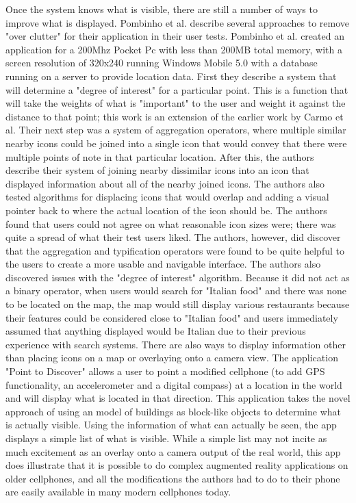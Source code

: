 \documentclass{acm_proc_article-sp}
\begin{document}
Once the system knows what is visible, there are still a number of ways to improve what is displayed.  Pombinho et al. describe several approaches to remove "over clutter" for their application in their user tests.  Pombinho et al. created an application for a 200Mhz Pocket Pc with less than 200MB total memory, with a screen resolution of 320x240 running Windows Mobile 5.0 with a database running on a server to provide location data.  First they describe a system that will determine a "degree of interest" for a particular point. This is a function that will take the weights of what is "important" to the user and weight it against the distance to that point; this work is an extension of the earlier work by Carmo et al. \cite{carmo2008movisys}  Their next step was a system of aggregation operators, where multiple similar nearby icons could be joined into a single icon that would convey that there were multiple points of note in that particular location.  After this, the authors describe their system of joining nearby dissimilar icons into an icon that displayed information about all of the nearby joined icons.  The authors also tested algorithms for displacing icons that would overlap and adding a visual pointer back to where the actual location of the icon should be.  The authors found that users could not agree on what reasonable icon sizes were; there was quite a spread of what their test users liked.  The authors, however, did discover that the aggregation and typification operators were found to be quite helpful to the users to create a more usable and navigable interface. The authors also discovered issues with the "degree of interest" algorithm.  Because it did not act as a binary operator, when users would search for "Italian food" and there was none to be located on the map, the map would still display various restaurants because their features could be considered close to "Italian food" and users immediately assumed that anything displayed would be Italian due to their previous experience with search systems.  \cite{pombinho2009evaluation}
There are also ways to display information other than placing icons on a map or overlaying onto a camera view.  The application "Point to Discover" allows a user to point a modified cellphone (to add GPS functionality, an accelerometer and a digital compass) at a location in the world and will display what is located in that direction.  This application takes the novel approach of using an model of buildings as block-like objects to determine what is actually visible.  Using the information of what can actually be seen, the app displays a simple list of what is visible. While a simple list may not incite as much excitement as an overlay onto a camera output of the real world, this app does illustrate that it is possible to do complex augmented reality applications on older cellphones, and all the modifications the authors had to do to their phone are easily available in many modern cellphones today. \cite{simonpoint}
\end{document}
